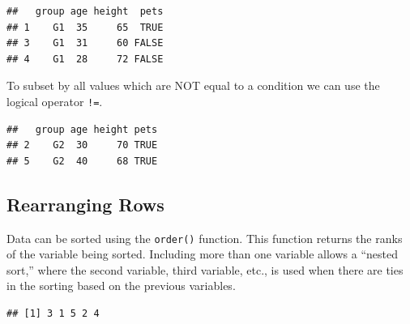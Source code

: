 \documentclass[
]{book}
\newenvironment{Shaded}{\begin{snugshade}}{\end{snugshade}}
\newcommand{\KeywordTok}[1]{\textcolor[rgb]{0.13,0.29,0.53}{\textbf{#1}}}
\newcommand{\NormalTok}[1]{#1}
\newcommand{\OperatorTok}[1]{\textcolor[rgb]{0.81,0.36,0.00}{\textbf{#1}}}
\newcommand{\StringTok}[1]{\textcolor[rgb]{0.31,0.60,0.02}{#1}}
\begin{document}
\begin{verbatim}
##   group age height  pets
## 1    G1  35     65  TRUE
## 3    G1  31     60 FALSE
## 4    G1  28     72 FALSE
\end{verbatim}

To subset by all values which are NOT equal to a condition we can use the logical operator \texttt{!=}.

\begin{Shaded}
\end{Shaded}

\begin{verbatim}
##   group age height pets
## 2    G2  30     70 TRUE
## 5    G2  40     68 TRUE
\end{verbatim}

\hypertarget{rearranging-rows}{%
\subsection*{Rearranging Rows}\label{rearranging-rows}}

Data can be sorted using the \texttt{order()} function. This function returns the ranks of the variable being sorted. Including more than one variable allows a ``nested sort,'' where the second variable, third variable, etc., is used when there are ties in the sorting based on the previous variables.

\begin{Shaded}
\end{Shaded}

\begin{verbatim}
## [1] 3 1 5 2 4
\end{verbatim}

\begin{Shaded}
\end{Shaded}
\end{document}
